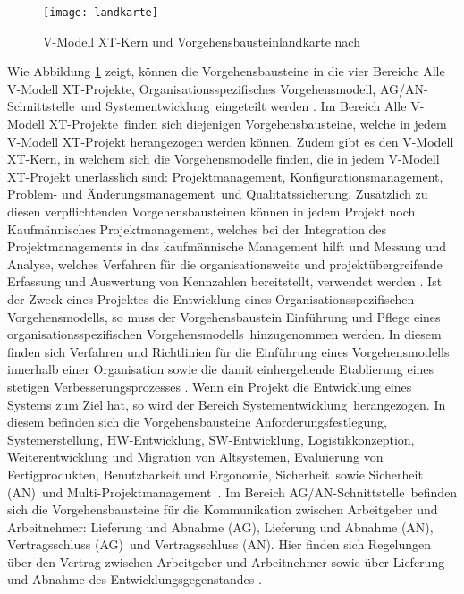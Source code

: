 \begin{figure}[htp]
\begin{center}
  \texttt{[image: landkarte]} %
  \caption{V-Modell XT-Kern und Vorgehensbausteinlandkarte nach \cite{2004vmodell}}
  \label{fig:landkarte}
\end{center}
\end{figure}

 Wie Abbildung \ref{fig:landkarte} zeigt, können die Vorgehensbausteine in die vier Bereiche \grqq Alle V-Modell XT-Projekte\grqq, \grqq Organisationsspezifisches Vorgehensmodell\grqq, \grqq AG/AN-Schnittstelle\grqq \ und \grqq Systementwicklung\grqq \  eingeteilt werden \cite{2004vmodell}.\newline
 Im Bereich \grqq Alle V-Modell XT-Projekte\grqq \ finden sich diejenigen Vorgehensbausteine, welche in jedem V-Modell XT-Projekt herangezogen werden können. Zudem gibt es den V-Modell XT-Kern, in welchem sich die Vorgehensmodelle finden, die in jedem V-Modell XT-Projekt unerlässlich sind: \grqq Projektmanagement\grqq, \grqq Konfigurationsmanagement\grqq, \grqq Problem- und Änderungsmanagement\grqq \ und \grqq Qualitätssicherung\grqq. Zusätzlich zu diesen verpflichtenden Vorgehensbausteinen können in jedem Projekt noch \grqq Kaufmännisches Projektmanagement\grqq, welches bei der Integration des Projektmanagements in das kaufmännische Management hilft und \grqq Messung und Analyse\grqq, welches Verfahren für die organisationsweite und projektübergreifende Erfassung und Auswertung von Kennzahlen bereitstellt, verwendet werden \cite{2004vmodell}.\newline
 Ist der Zweck eines Projektes die Entwicklung eines \grqq Organisationsspezifischen Vorgehensmodells\grqq, so muss der Vorgehensbaustein \grqq Einführung und Pflege eines organisationsspezifischen Vorgehensmodells\grqq \ hinzugenommen werden. In diesem finden sich Verfahren und Richtlinien für die Einführung eines Vorgehensmodells innerhalb einer Organisation sowie die damit einhergehende Etablierung eines stetigen Verbesserungsprozesses \cite{2004vmodell}.\newline
 Wenn ein Projekt die Entwicklung eines Systems zum Ziel hat, so wird der Bereich \grqq Systementwicklung\grqq \ herangezogen. In diesem befinden sich die Vorgehensbausteine \grqq Anforderungsfestlegung\grqq, \grqq Systemerstellung\grqq, \grqq HW-Entwicklung\grqq, \grqq SW-Entwicklung\grqq, \grqq Logistikkonzeption\grqq, \grqq Weiterentwicklung und Migration von Altsystemen\grqq, \grqq Evaluierung von Fertigprodukten\grqq, \grqq Benutzbarkeit und Ergonomie\grqq, \grqq Sicherheit\grqq \ sowie \grqq Sicherheit (AN)\grqq \ und \grqq Multi-Projektmanagement\grqq \ \cite{2004vmodell}. \newline
 Im Bereich \grqq AG/AN-Schnittstelle\grqq \ befinden sich die Vorgehensbausteine für die Kommunikation zwischen Arbeitgeber und Arbeitnehmer: \grqq Lieferung und Abnahme (AG)\grqq, \grqq Lieferung und Abnahme (AN)\grqq, \grqq Vertragsschluss (AG)\grqq \ und \grqq Vertragsschluss (AN)\grqq. Hier finden sich Regelungen über den Vertrag zwischen Arbeitgeber und Arbeitnehmer sowie über Lieferung und Abnahme des Entwicklungsgegenstandes \cite{2004vmodell}. \newline
 
